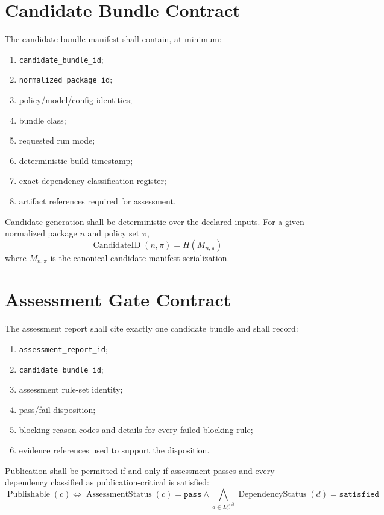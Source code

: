 \section{Candidate Bundle Contract}
The candidate bundle manifest shall contain, at minimum:
\begin{enumerate}[leftmargin=1.2cm]
    \item \texttt{candidate\_bundle\_id};
    \item \texttt{normalized\_package\_id};
    \item policy/model/config identities;
    \item bundle class;
    \item requested run mode;
    \item deterministic build timestamp;
    \item exact dependency classification register;
    \item artifact references required for assessment.
\end{enumerate}

Candidate generation shall be deterministic over the declared inputs. For a given normalized package \(n\) and policy set \(\pi\),
\[
\operatorname{CandidateID}(n,\pi)=H(M_{n,\pi})
\]
where \(M_{n,\pi}\) is the canonical candidate manifest serialization.

\section{Assessment Gate Contract}
The assessment report shall cite exactly one candidate bundle and shall record:
\begin{enumerate}[leftmargin=1.2cm]
    \item \texttt{assessment\_report\_id};
    \item \texttt{candidate\_bundle\_id};
    \item assessment rule-set identity;
    \item pass/fail disposition;
    \item blocking reason codes and details for every failed blocking rule;
    \item evidence references used to support the disposition.
\end{enumerate}

Publication shall be permitted if and only if assessment passes and every dependency classified as publication-critical is satisfied:
\[
\operatorname{Publishable}(c) \iff \operatorname{AssessmentStatus}(c)=\texttt{pass} \land \bigwedge_{d\in D_c^{crit}}\operatorname{DependencyStatus}(d)=\texttt{satisfied}
\]

